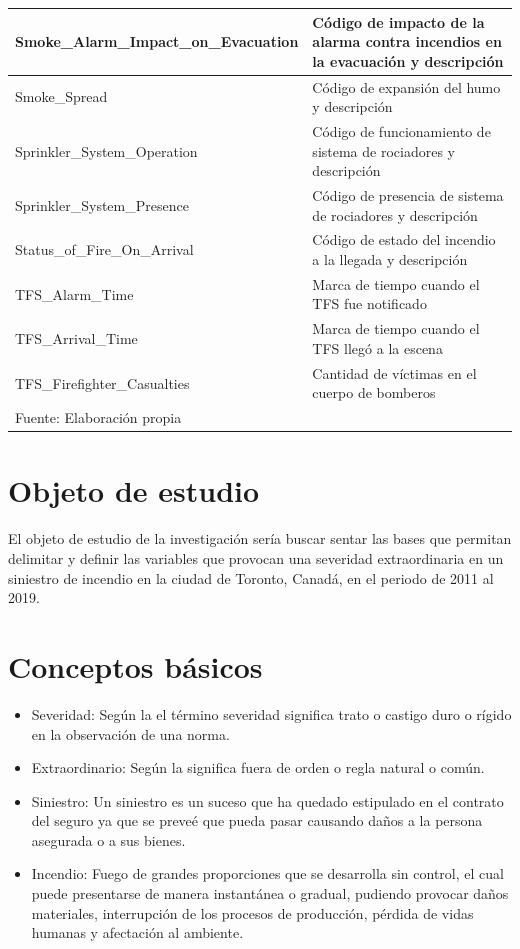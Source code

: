 \documentclass[
  oneside]{memoir}
\begin{document}
\begin{longtable}[t]{l|>{\raggedright\arraybackslash}p{7cm}}
\hline
Smoke\_Alarm\_Impact\_on\_Evacuation & Código de impacto de la alarma contra incendios en la evacuación y descripción\\
\hline
Smoke\_Spread & Código de expansión del humo y descripción\\
\hline
Sprinkler\_System\_Operation & Código de funcionamiento de sistema de rociadores y descripción\\
\hline
Sprinkler\_System\_Presence & Código de presencia de sistema de rociadores y descripción\\
\hline
Status\_of\_Fire\_On\_Arrival & Código de estado del incendio a la llegada y descripción\\
\hline
TFS\_Alarm\_Time & Marca de tiempo cuando el TFS fue notificado\\
\hline
TFS\_Arrival\_Time & Marca de tiempo cuando el TFS llegó a la escena\\
\hline
TFS\_Firefighter\_Casualties & Cantidad de víctimas en el cuerpo de bomberos\\
\hline
\multicolumn{2}{l}{\rule{0pt}{1em}Fuente: Elaboración propia}\\
\end{longtable}

\section{Objeto de estudio}

El objeto de estudio de la investigación sería buscar sentar las bases
que permitan delimitar y definir las variables que provocan una
severidad extraordinaria en un siniestro de incendio en la ciudad de
Toronto, Canadá, en el periodo de 2011 al 2019.

\section{Conceptos básicos}
\begin{itemize}

\item Severidad: Según la \citet{RAE1} el término severidad significa trato o castigo duro o rígido en la observación de una norma. 

\item Extraordinario: Según la \citet{RAE2} significa fuera de orden o regla natural o común.

\item Siniestro: Un siniestro es un suceso que ha quedado estipulado en el contrato del seguro ya que se preveé que pueda pasar causando daños a la persona asegurada o a sus bienes. \citep{Allianz}

\item Incendio: Fuego de grandes proporciones que se desarrolla sin control, el cual puede presentarse de manera instantánea o gradual, pudiendo provocar daños materiales, interrupción de los procesos de producción, pérdida de vidas humanas y afectación al ambiente. \citep{UNAM}

\end{itemize}
\end{document}
